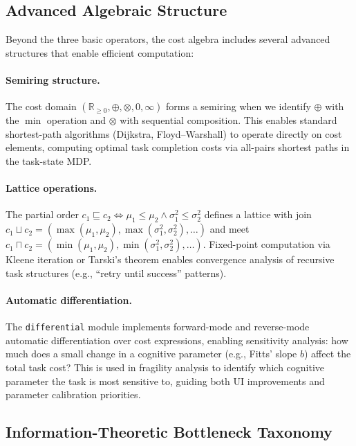 \documentclass[11pt,twocolumn]{article}
\theoremstyle{definition}
\newcommand{\R}{\mathbb{R}}
\begin{document}
\subsection{Advanced Algebraic Structure}

Beyond the three basic operators, the cost algebra includes several advanced structures that enable efficient computation:

\paragraph{Semiring structure.}
The cost domain $(\R_{\geq 0}, \oplus, \otimes, 0, \infty)$ forms a semiring when we identify $\oplus$ with the $\min$ operation and $\otimes$ with sequential composition.
This enables standard shortest-path algorithms (Dijkstra, Floyd--Warshall) to operate directly on cost elements, computing optimal task completion costs via all-pairs shortest paths in the task-state MDP.

\paragraph{Lattice operations.}
The partial order $c_1 \sqsubseteq c_2 \iff \mu_1 \leq \mu_2 \wedge \sigma^2_1 \leq \sigma^2_2$ defines a lattice with join $c_1 \sqcup c_2 = (\max(\mu_1,\mu_2), \max(\sigma^2_1,\sigma^2_2), \ldots)$ and meet $c_1 \sqcap c_2 = (\min(\mu_1,\mu_2), \min(\sigma^2_1,\sigma^2_2), \ldots)$.
Fixed-point computation via Kleene iteration or Tarski's theorem enables convergence analysis of recursive task structures (e.g., ``retry until success'' patterns).

\paragraph{Automatic differentiation.}
The \texttt{differential} module implements forward-mode and reverse-mode automatic differentiation over cost expressions, enabling sensitivity analysis: how much does a small change in a cognitive parameter (e.g., Fitts' slope $b$) affect the total task cost?
This is used in fragility analysis to identify which cognitive parameter the task is most sensitive to, guiding both UI improvements and parameter calibration priorities.

\subsection{Information-Theoretic Bottleneck Taxonomy}
\label{sec:taxonomy}
\end{document}
